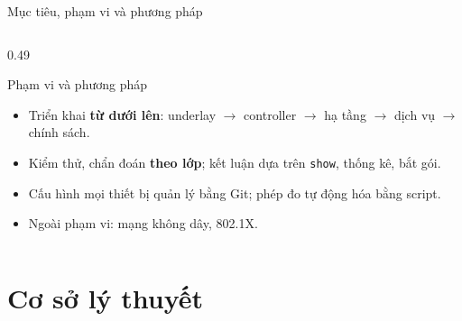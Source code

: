 \documentclass[aspectratio=169, 10pt, xcolor={table}]{beamer}
\begin{document}
\begin{frame}{Mục tiêu, phạm vi và phương pháp}
\begin{columns}[T]
\begin{column}{0.49\textwidth}
\begin{card}[accent]{Phạm vi và phương pháp}
\begin{itemize}
                    \item Triển khai \textbf{từ dưới lên}: underlay $\rightarrow$ controller $\rightarrow$ hạ tầng $\rightarrow$ dịch vụ $\rightarrow$ chính sách.
                    \item Kiểm thử, chẩn đoán \textbf{theo lớp}; kết luận dựa trên \texttt{show}, thống kê, bắt gói.
                    \item Cấu hình mọi thiết bị quản lý bằng Git; phép đo tự động hóa bằng script.
                    \item Ngoài phạm vi: mạng không dây, 802.1X.
                \end{itemize}
            \end{card}
        \end{column}
    \end{columns}
\end{frame}

\section{Cơ sở lý thuyết}
\end{document}
